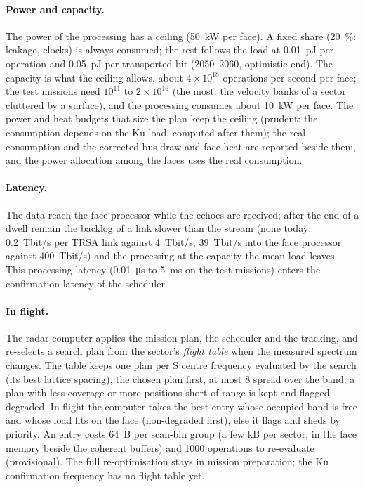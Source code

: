 \documentclass[11pt,a4paper]{article}
\begin{document}
\paragraph{Power and capacity.} The power of the processing has a ceiling (\SI{50}{kW} per face). A fixed share
(\SI{20}{\percent}: leakage, clocks) is always consumed; the rest follows the load at \SI{0.01}{pJ} per operation and
\SI{0.05}{pJ} per transported bit (2050--2060, optimistic end). The capacity is what the ceiling allows, about
$4\times10^{18}$ operations per second per face; the test missions need $10^{11}$ to $2\times10^{16}$ (the most: the
velocity banks of a sector cluttered by a surface), and the processing consumes about \SI{10}{kW} per face. The
power and heat budgets that size the plan keep the ceiling (prudent: the consumption depends on the Ku load, computed
after them); the real consumption and the corrected bus draw and face heat are reported beside them, and the power
allocation among the faces uses the real consumption.

\paragraph{Latency.} The data reach the face processor while the echoes are received; after the end of a dwell remain
the backlog of a link slower than the stream (none today: \SI{0.2}{Tbit/s} per TRSA link against \SI{4}{Tbit/s},
\SI{39}{Tbit/s} into the face processor against \SI{400}{Tbit/s}) and the processing at the capacity the mean load
leaves. This processing latency (\SI{0.01}{\micro s} to \SI{5}{ms} on the test missions) enters the confirmation
latency of the scheduler.

\paragraph{In flight.} The radar computer applies the mission plan, the scheduler and the tracking, and re-selects a
search plan from the sector's \emph{flight table} when the measured spectrum changes. The table keeps one plan per S
centre frequency evaluated by the search (its best lattice spacing), the chosen plan first, at most 8 spread over the
band; a plan with less coverage or more positions short of range is kept and flagged degraded. In flight the computer
takes the best entry whose occupied band is free and whose load fits on the face (non-degraded first), else it flags
and sheds by priority. An entry costs \SI{64}{B} per scan-bin group (a few kB per sector, in the face memory beside the
coherent buffers) and \num{1000} operations to re-evaluate (provisional). The full re-optimisation stays in mission
preparation; the Ku confirmation frequency has no flight table yet.
\end{document}
